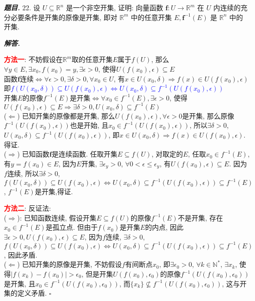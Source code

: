 \documentclass[10pt, a4paper, oneside]{ctexart}
\newenvironment{problem}{\begin{framed}\par\noindent\textbf{\textit{题目. }}}{\end{framed}\par}
\newenvironment{solution}{%
  \par\noindent\textbf{\textit{解答. }}\ignorespaces
}{%
  \hfill\ensuremath{\square}\par %
}
\begin{document}
\begin{problem}
22. 设 $U \subseteq \mathbb{R}^n$ 是一个非空开集, 证明: 向量函数 $\boldsymbol{f}: U \rightarrow \mathbb{R}^m$ 在 $U$ 内连续的充分必要条件是开集的原像是开集, 即对 $\mathbb{R}^m$ 中的任意开集 $E, \boldsymbol{f}^{-1}(E)$ 是 $\mathbb{R}^n$ 中的开集.
\end{problem}
\begin{solution}
\textcolor{red}{\textbf{方法一}}: 不妨假设在$\mathbb{R}^m$取的任意开集$E$属于$f(U)$, 那么$\forall y\in E, \exists x_0, f(x_0)=y, \exists \epsilon>0$, 使得$U(f(x_0),\epsilon)\subseteq E$\\
函数$\bm{f}$连续$\iff \forall \epsilon>0, \exists \delta>0, \forall x_0\in U$, 有$x\in U(x_0,\delta) \Rightarrow f(x)\in U(f(x_0),\epsilon)$\\
即\textcolor{blue}{$f(U(x_0,\delta))\subseteq U(f(x_0),\epsilon)\iff U(x_0,\delta)\subseteq f^{-1}(U(f(x_0),\epsilon))$}\\
开集$E$的原像$f^{-1}(E)$是开集$\iff \forall x_0\in f^{-1}(E), \exists \epsilon>0$, 使得$U(f(x_0),\epsilon)\subseteq E\Rightarrow$$\exists \delta>0, U(x_0,\delta) \subseteq f^{-1}(E)$\\
($\Leftarrow$) 已知开集的原像都是开集, 那么$U(f(x_0),\epsilon), \forall \epsilon>0$是开集, 那么原像$f^{-1}(U(f(x_0),\epsilon))$也是开始, 且$x_0\in f^{-1}(U(f(x_0),\epsilon))$, 所以$\exists \delta>0$, $U(x_0,\delta)\subseteq f^{-1}(U(f(x_0),\epsilon))$, 即$x\in U(x_0,\delta)\Rightarrow f(x)\in U(f(x_0),\epsilon)$. 得证.\\
($\Rightarrow$) 已知函数$\bm{f}$是连续函数. 任取开集$E\subseteq f(U)$, 对取定的$E$, 任取$x_0\in f^{-1}(E)$, 有$y=f(x_0)\in E$, 因为$E$开集, $\exists \epsilon_{y}>0$, $\forall 0<\epsilon\leq \epsilon_y$, 有$U(f(x_0),\epsilon)\subseteq E$. 因为$f$连续, 所以$\exists \delta>0$, $f(U(x_0,\delta))\subseteq U(f(x_0),\epsilon)\iff U(x_0,\delta)\subseteq f^{-1}(U(f(x_0),\epsilon))\subseteq f^{-1}(E)$, $f^{-1}(E)$是开集,得证.

\textcolor{red}{\textbf{方法二}}: 反证法:\\
($\Rightarrow$): 已知函数连续, 假设开集$E\subseteq f(U)$的原像$f^{-1}(E)$不是开集, 存在$x_0\in f^{-1}(E)$是孤立点. 但由于$f(x_0)$是开集$E$的内点, 因此$\exists \epsilon>0, U(f(x_0),\epsilon)\subseteq E$, 因为$f$连续, $\exists \delta>0$, $f(U(x_0,\delta))\subseteq U(f(x_0),\epsilon) \iff U(x_0,\delta)\subseteq f^{-1}(U(f(x_0),\epsilon))\subseteq f^{-1}(E)$, 因此矛盾.\\
($\Leftarrow$) 已知开集的原像是开集, 不妨假设$f$有间断点$x_0$, 即$\exists \epsilon_0>0$, $\forall k\in \mathbb{N}^*$, $\exists x_k$, 使得$|f(x_k)-f(x_0)|>\epsilon_0$, 但是开集$U(f(x_0),\epsilon_0)$的原像$f^{-1}(U(f(x_0),\epsilon_0))$是开集, 且$x_0\in f^{-1}(U(f(x_0),\epsilon_0))$, 而$\{x_k\}\not\subseteq f^{-1}(U(f(x_0),\epsilon_0))$, 这与开集的定义矛盾.
\end{solution}
\end{document}

